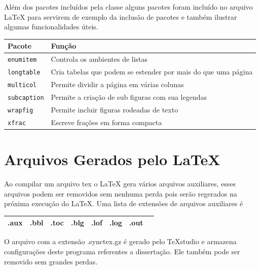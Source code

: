 \documentclass[fleqn]{icat-ufal}
\newcommand{\TeXstudio}{\TeX\textsf{studio}}
\begin{document}
Além dos pacotes incluídos pela classe alguns pacotes foram incluído no arquivo \LaTeX{}
para servirem de exemplo da inclusão de pacotes e também ilustrar algumas funcionalidades
úteis. 
\begin{center}
    \begin{longtable}{ll}
        \hline
        Pacote                 & Função                                                        \\ \hline
        \lstinline!enumitem!   & Controla os ambientes de listas                               \\
        \lstinline!longtable!  & Cria tabelas que podem se estender por mais do que uma página \\
        \lstinline!multicol!   & Permite dividir a página em várias colunas                    \\
        \lstinline!subcaption! & Permite a criação de sub figuras com sua legendas             \\
        \lstinline!wrapfig!    & Permite incluir figuras rodeadas de texto                     \\
        \lstinline!xfrac!      & Escreve frações em forma compacta                             \\ \hline
    \end{longtable}
\end{center}

\section{Arquivos Gerados pelo \LaTeX{}}
\label{sec:arquivos_gerados_pelo_latex}

Ao compilar um arquivo \textsf{tex} o \LaTeX{} gera vários arquivos auxiliares,
esses arquivos podem ser removidos sem nenhuma perda pois serão regerados na
próxima execução do \LaTeX. Uma lista de extensões de arquivos auxiliares é
\begin{center}
    \begin{tabular}{cccccccc}    \hline
        \textsf{.aux} & \textsf{.bbl} & \textsf{.toc} &
        \textsf{.blg} & \textsf{.lof} & \textsf{.log} & 
        \textsf{.out} \\ \hline
    \end{tabular}
\end{center}

O arquivo com a extensão \textsf{.synctex.gz} é gerado pelo \TeXstudio{}
e armazena configurações deste programa referentes a dissertação. Ele também
pode ser removido sem grandes perdas.
\end{document}
